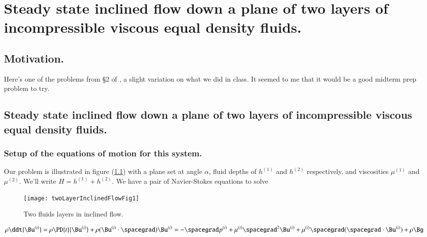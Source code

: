 %
%


\chapter{Steady state inclined flow down a plane of two layers of incompressible viscous equal density fluids.}
\label{chap:twoLayerInclinedFlow}
{}
\date{Mar 1, 2012}

\beginArtWithToc

\section{Motivation.}

Here's one of the problems from \S 2 of \cite{acheson1990elementary}, a slight variation on what we did in class.  It seemed to me that it would be a good midterm prep problem to try.

\section{Steady state inclined flow down a plane of two layers of incompressible viscous equal density fluids.}

\subsection{Setup of the equations of motion for this system.}

Our problem is illustrated in figure (\ref{fig:twoLayerInclinedFlow:twoLayerInclinedFlowFig1}) with a plane set at angle $\alpha$, fluid depths of $h^{(1)}$ and $h^{(2)}$ respectively, and viscosities $\mu^{(1)}$ and $\mu^{(2)}$.  We'll write $H = h^{(1)} + h^{(2)}$.  We have a pair of Navier-Stokes equations to solve

\begin{figure}[htp]
   \centering
   \texttt{[image: twoLayerInclinedFlowFig1]}
   \caption{Two fluids layers in inclined flow.}\label{fig:twoLayerInclinedFlow:twoLayerInclinedFlowFig1}
\end{figure}

\begin{equation}\label{eqn:twoLayerInclinedFlow:10}
\rho \ddt{\Bu^{(i)}} = \rho \PD{t}{\Bu^{(i)}} + \rho (\Bu^{(i)} \cdot \spacegrad) \Bu^{(i)} = - \spacegrad p^{(i)} + \mu^{(i)} \spacegrad^2 \Bu^{(i)} + \mu^{(i)} \spacegrad (\spacegrad \cdot \Bu^{(i)}) + \rho \Bg
\end{equation}

